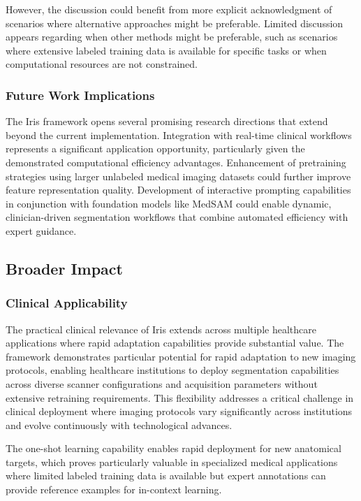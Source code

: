However, the discussion could benefit from more explicit acknowledgment of scenarios where alternative approaches might be preferable. Limited discussion appears regarding when other methods might be preferable, such as scenarios where extensive labeled training data is available for specific tasks or when computational resources are not constrained.

\subsubsection{Future Work Implications}
The Iris framework opens several promising research directions that extend beyond the current implementation. Integration with real-time clinical workflows represents a significant application opportunity, particularly given the demonstrated computational efficiency advantages. Enhancement of pretraining strategies using larger unlabeled medical imaging datasets could further improve feature representation quality. Development of interactive prompting capabilities in conjunction with foundation models like MedSAM could enable dynamic, clinician-driven segmentation workflows that combine automated efficiency with expert guidance.

\subsection{Broader Impact}
\subsubsection{Clinical Applicability}
The practical clinical relevance of Iris extends across multiple healthcare applications where rapid adaptation capabilities provide substantial value. The framework demonstrates particular potential for rapid adaptation to new imaging protocols, enabling healthcare institutions to deploy segmentation capabilities across diverse scanner configurations and acquisition parameters without extensive retraining requirements. This flexibility addresses a critical challenge in clinical deployment where imaging protocols vary significantly across institutions and evolve continuously with technological advances.

The one-shot learning capability enables rapid deployment for new anatomical targets, which proves particularly valuable in specialized medical applications where limited labeled training data is available but expert annotations can provide reference examples for in-context learning.

